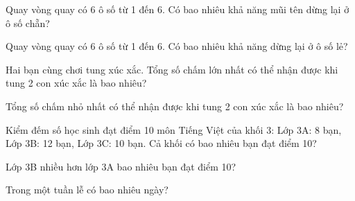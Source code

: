 \begin{ex}
Quay vòng quay có 6 ô số từ 1 đến 6. Có bao nhiêu khả năng mũi tên dừng lại ở ô số chẵn?
\end{ex}

\begin{ex}
Quay vòng quay có 6 ô số từ 1 đến 6. Có bao nhiêu khả năng dừng lại ở ô số lẻ?
\end{ex}

\begin{ex}
Hai bạn cùng chơi tung xúc xắc. Tổng số chấm lớn nhất có thể nhận được khi tung 2 con xúc xắc là bao nhiêu?
\end{ex}

\begin{ex}
Tổng số chấm nhỏ nhất có thể nhận được khi tung 2 con xúc xắc là bao nhiêu?
\end{ex}

\begin{ex}
Kiểm đếm số học sinh đạt điểm 10 môn Tiếng Việt của khối 3: Lớp 3A: 8 bạn, Lớp 3B: 12 bạn, Lớp 3C: 10 bạn. Cả khối có bao nhiêu bạn đạt điểm 10?
\end{ex}

\begin{ex}
Lớp 3B nhiều hơn lớp 3A bao nhiêu bạn đạt điểm 10?
\end{ex}

\begin{ex}
Trong một tuần lễ có bao nhiêu ngày?
\end{ex}
